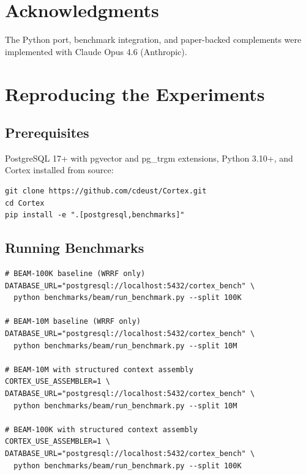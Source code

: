 \documentclass[11pt]{article}
\begin{document}
\section*{Acknowledgments}

The Python port, benchmark integration, and paper-backed complements
were implemented with Claude Opus 4.6 (Anthropic).

\appendix

\section{Reproducing the Experiments}
\label{app:reproducing}

\subsection{Prerequisites}

PostgreSQL 17+ with pgvector and pg\_trgm extensions, Python 3.10+,
and Cortex installed from source:

\begin{verbatim}
git clone https://github.com/cdeust/Cortex.git
cd Cortex
pip install -e ".[postgresql,benchmarks]"
\end{verbatim}

\subsection{Running Benchmarks}

\begin{verbatim}
# BEAM-100K baseline (WRRF only)
DATABASE_URL="postgresql://localhost:5432/cortex_bench" \
  python benchmarks/beam/run_benchmark.py --split 100K

# BEAM-10M baseline (WRRF only)
DATABASE_URL="postgresql://localhost:5432/cortex_bench" \
  python benchmarks/beam/run_benchmark.py --split 10M

# BEAM-10M with structured context assembly
CORTEX_USE_ASSEMBLER=1 \
DATABASE_URL="postgresql://localhost:5432/cortex_bench" \
  python benchmarks/beam/run_benchmark.py --split 10M

# BEAM-100K with structured context assembly
CORTEX_USE_ASSEMBLER=1 \
DATABASE_URL="postgresql://localhost:5432/cortex_bench" \
  python benchmarks/beam/run_benchmark.py --split 100K
\end{verbatim}
\end{document}
